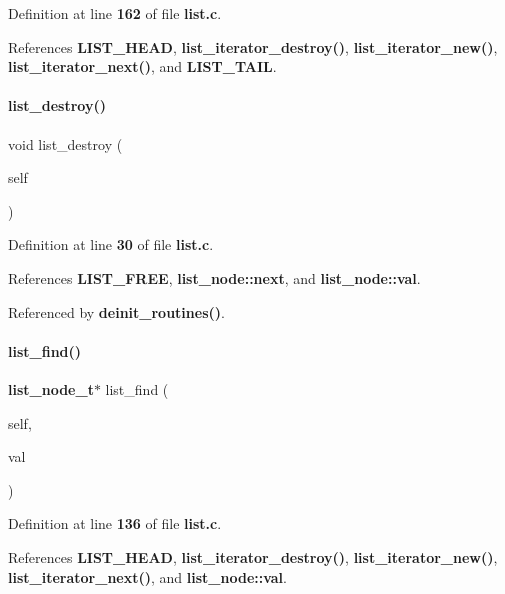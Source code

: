 Definition at line \textbf{ 162} of file \textbf{ list.\+c}.



References \textbf{ L\+I\+S\+T\+\_\+\+H\+E\+AD}, \textbf{ list\+\_\+iterator\+\_\+destroy()}, \textbf{ list\+\_\+iterator\+\_\+new()}, \textbf{ list\+\_\+iterator\+\_\+next()}, and \textbf{ L\+I\+S\+T\+\_\+\+T\+A\+IL}.

\mbox{\label{list_8h_ac2d2be572a896cccd0e76d56eeefcbdb}} 
\paragraph{list\+\_\+destroy()}
{\footnotesize\ttfamily void list\+\_\+destroy (\begin{DoxyParamCaption}\item[{\textbf{ list\+\_\+t} $\ast$}]{self }\end{DoxyParamCaption})}



Definition at line \textbf{ 30} of file \textbf{ list.\+c}.



References \textbf{ L\+I\+S\+T\+\_\+\+F\+R\+EE}, \textbf{ list\+\_\+node\+::next}, and \textbf{ list\+\_\+node\+::val}.



Referenced by \textbf{ deinit\+\_\+routines()}.

\mbox{\label{list_8h_a5d73352b7bfa0c5a8b33289d7b27a374}} 
\paragraph{list\+\_\+find()}
{\footnotesize\ttfamily \textbf{ list\+\_\+node\+\_\+t}$\ast$ list\+\_\+find (\begin{DoxyParamCaption}\item[{\textbf{ list\+\_\+t} $\ast$}]{self,  }\item[{void $\ast$}]{val }\end{DoxyParamCaption})}



Definition at line \textbf{ 136} of file \textbf{ list.\+c}.



References \textbf{ L\+I\+S\+T\+\_\+\+H\+E\+AD}, \textbf{ list\+\_\+iterator\+\_\+destroy()}, \textbf{ list\+\_\+iterator\+\_\+new()}, \textbf{ list\+\_\+iterator\+\_\+next()}, and \textbf{ list\+\_\+node\+::val}.

